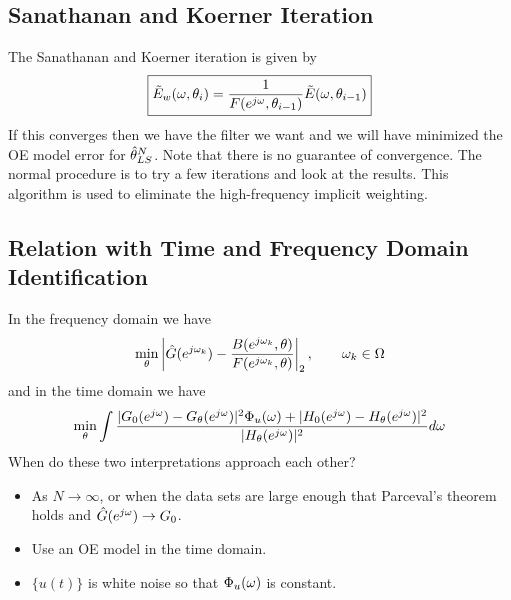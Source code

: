 \subsection{Sanathanan and Koerner Iteration}
The Sanathanan and Koerner iteration is given by
\begin{align*}
\boxed{\tilde{E}_w(\omega,\theta_i) = \frac{1}{F(e^{j\omega},\theta_{i-1})}\tilde{E}(\omega,\theta_{i-1})}
\end{align*}
If this converges then we have the filter we want and we will have minimized the OE model error for $\hat{\theta}_{LS}^N$.
Note that there is no guarantee of convergence.
The normal procedure is to try a few iterations and look at the results.
This algorithm is used to eliminate the high-frequency implicit weighting.

\subsection{Relation with Time and Frequency Domain Identification}
In the frequency domain we have
\begin{align*}
\min_\theta\left|\hat{G}(e^{j\omega_k}) - \frac{B(e^{j\omega_k},\theta)}{F(e^{j\omega_k},\theta)}\right|_2, \qquad \omega_k\in\Omega
\end{align*}
and in the time domain we have
\begin{align*}
\min_\theta\int\frac{|G_0(e^{j\omega})-G_\theta(e^{j\omega})|^2\Phi_u(\omega) + |H_0(e^{j\omega})-H_\theta(e^{j\omega})|^2}{|H_\theta(e^{j\omega})|^2}d\omega
\end{align*}
When do these two interpretations approach each other?
\begin{itemize}
\item As $N\to\infty$, or when the data sets are large enough that Parceval's theorem holds and $\hat{G}(e^{j\omega})\to G_0$.
\item Use an OE model in the time domain.
\item $\{u(t)\}$ is white noise so that $\Phi_u(\omega)$ is constant.
\end{itemize}
